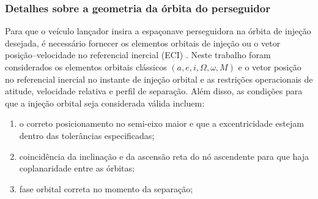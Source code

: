 \subsubsection{Detalhes sobre a geometria da órbita do perseguidor}

Para que o veículo lançador insira a espaçonave perseguidora na órbita de injeção desejada, é necessário fornecer os elementos orbitais \cite{vallado2007fundamentals} de injeção ou o vetor posição--velocidade no referencial inercial (ECI) .
Neste trabalho foram considerados os elementos orbitais clássicos $(a, e, i, \Omega, \omega, M)$ e o vetor posição no referencial inercial no instante de injeção orbital e as restrições operacionais de atitude, velocidade relativa e perfil de separação.
Além disso, as condições para que a injeção orbital seja considerada válida incluem:

\begin{enumerate}[label=(\roman*)]
    \item o correto posicionamento no semi-eixo maior e que a excentricidade estejam dentro das tolerâncias especificadas;
    \item coincidência da inclinação e da ascensão reta do nó ascendente para que haja coplanaridade entre as órbitas;
    \item fase orbital correta no momento da separação;
\end{enumerate}

